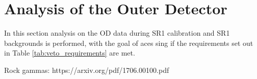 \chapter{Analysis of the Outer Detector} \label{chap:analysis_of_the_od}

In this section analysis on the OD data during SR1 calibration and SR1 backgrounds is performed, with the goal of aces sing if the requirements set out in Table \ref{tab:veto_requirements} are met.

Rock gammas: https://arxiv.org/pdf/1706.00100.pdf

%

%

%

%





